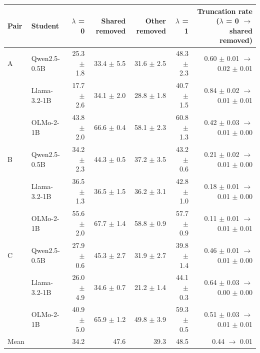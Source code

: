 \begin{tabular}{llrrrrr}
\toprule
Pair & Student & $\lambda$ = 0 & Shared removed & Other removed & $\lambda$ = 1 & Truncation rate ($\lambda$ = 0 $\rightarrow$ shared removed) \\
\midrule
A & Qwen2.5-0.5B & 25.3 $\pm$ 1.8 & 33.4 $\pm$ 5.5 & 31.6 $\pm$ 2.5 & 48.3 $\pm$ 2.3 & 0.60 $\pm$ 0.01 $\rightarrow$ 0.02 $\pm$ 0.01 \\
 & Llama-3.2-1B & 17.7 $\pm$ 2.6 & 34.1 $\pm$ 2.0 & 28.8 $\pm$ 1.8 & 40.7 $\pm$ 1.5 & 0.84 $\pm$ 0.02 $\rightarrow$ 0.01 $\pm$ 0.01 \\
 & OLMo-2-1B & 43.8 $\pm$ 2.0 & 66.6 $\pm$ 0.4 & 58.1 $\pm$ 2.3 & 60.8 $\pm$ 1.3 & 0.42 $\pm$ 0.03 $\rightarrow$ 0.01 $\pm$ 0.00 \\
\midrule
B & Qwen2.5-0.5B & 34.2 $\pm$ 2.3 & 44.3 $\pm$ 0.5 & 37.2 $\pm$ 3.5 & 43.2 $\pm$ 0.6 & 0.21 $\pm$ 0.02 $\rightarrow$ 0.01 $\pm$ 0.00 \\
 & Llama-3.2-1B & 36.5 $\pm$ 1.3 & 36.5 $\pm$ 1.5 & 36.2 $\pm$ 3.1 & 42.8 $\pm$ 1.0 & 0.18 $\pm$ 0.01 $\rightarrow$ 0.01 $\pm$ 0.00 \\
 & OLMo-2-1B & 55.6 $\pm$ 2.0 & 67.7 $\pm$ 1.4 & 58.8 $\pm$ 0.9 & 57.7 $\pm$ 0.9 & 0.11 $\pm$ 0.01 $\rightarrow$ 0.01 $\pm$ 0.01 \\
\midrule
C & Qwen2.5-0.5B & 27.9 $\pm$ 0.6 & 45.3 $\pm$ 2.7 & 31.9 $\pm$ 2.7 & 39.8 $\pm$ 1.4 & 0.46 $\pm$ 0.01 $\rightarrow$ 0.01 $\pm$ 0.00 \\
 & Llama-3.2-1B & 26.0 $\pm$ 4.9 & 34.6 $\pm$ 0.7 & 21.2 $\pm$ 1.4 & 44.1 $\pm$ 0.3 & 0.64 $\pm$ 0.03 $\rightarrow$ 0.00 $\pm$ 0.00 \\
 & OLMo-2-1B & 40.9 $\pm$ 5.0 & 65.9 $\pm$ 1.2 & 49.8 $\pm$ 3.9 & 59.3 $\pm$ 0.5 & 0.51 $\pm$ 0.03 $\rightarrow$ 0.01 $\pm$ 0.01 \\
\midrule
Mean &  & 34.2 & 47.6 & 39.3 & 48.5 & 0.44 $\rightarrow$ 0.01 \\
\bottomrule
\end{tabular}
